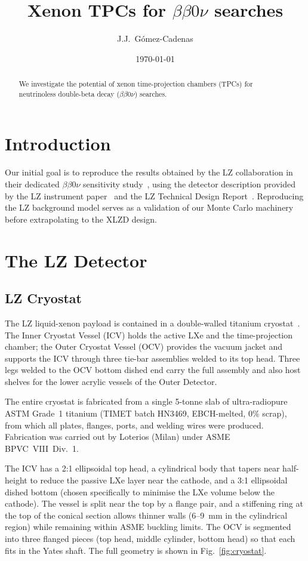 \documentclass[11pt,a4paper]{article}
\title{Xenon TPCs for $\beta\beta0\nu$ searches}
\author{J.J.~G\'omez-Cadenas}
\date{\today}
\begin{document}
\maketitle

\begin{abstract}
We investigate the potential of xenon time-projection chambers (TPCs)
for neutrinoless double-beta decay ($\beta\beta0\nu$) searches.
\end{abstract}

\section*{Introduction}
\label{sec:intro}

Our initial goal is to reproduce the results obtained by the LZ
collaboration in their dedicated $\beta\beta0\nu$ sensitivity
study~\cite{LZ-bbonu}, using the detector description provided by the
LZ instrument paper~\cite{LZ-instrument} and the LZ Technical Design
Report~\cite{LZ-TDR}. Reproducing the LZ background model serves as
a validation of our Monte Carlo machinery before extrapolating to the
XLZD design.

\section{The LZ Detector}
\label{sec:lz}

\subsection{LZ Cryostat}
\label{sec:cryostat}

The LZ liquid-xenon payload is contained in a double-walled titanium
cryostat~\cite{LZ-instrument,LZ-TDR}. The Inner Cryostat Vessel (ICV)
holds the active LXe and the time-projection chamber; the Outer
Cryostat Vessel (OCV) provides the vacuum jacket and supports the ICV
through three tie-bar assemblies welded to its top head. Three legs
welded to the OCV bottom dished end carry the full assembly and also
host shelves for the lower acrylic vessels of the Outer Detector.

The entire cryostat is fabricated from a single 5-tonne slab of
ultra-radiopure ASTM Grade~1 titanium (TIMET batch HN3469, EBCH-melted,
0\% scrap), from which all plates, flanges, ports, and welding wires
were produced. Fabrication was carried out by Loterios (Milan) under
ASME BPVC~VIII~Div.~1.

The ICV has a 2:1 ellipsoidal top head, a cylindrical body that tapers
near half-height to reduce the passive LXe layer near the cathode, and
a 3:1 ellipsoidal dished bottom (chosen specifically to minimise the
LXe volume below the cathode). The vessel is split near the top by a
flange pair, and a stiffening ring at the top of the conical section
allows thinner walls (6--9~mm in the cylindrical region) while
remaining within ASME buckling limits. The OCV is segmented into three
flanged pieces (top head, middle cylinder, bottom head) so that each
fits in the Yates shaft. The full geometry is shown in
Fig.~\ref{fig:cryostat}.
\end{document}
